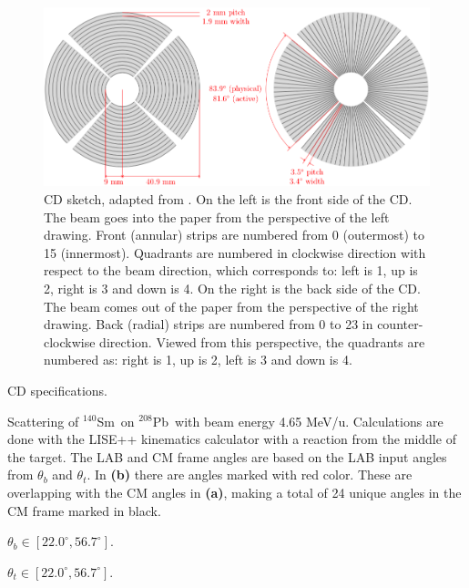 \documentclass[twoside,english]{uiofysmaster/uiofysmaster}
\newcommand{\Sm}{$^{140}$Sm} %
\newcommand{\Pb}{$^{208}$Pb}
\begin{document}
\begin{figure}[htb]
	\centering
	\includegraphics[width=\linewidth]{Images/CD.png}
	\caption{CD sketch, adapted from \cite{NWarr-CD}. 
	On the left is the front side of the CD. 
	The beam goes into the paper from the perspective of the left drawing.
	Front (annular) strips are numbered from 0 (outermost) to 15 (innermost). 
	Quadrants are numbered in clockwise direction with respect to the beam direction, which corresponds to: left is 1, up is 2, right is 3 and down is 4.
	On the right is the back side of the CD. 
	The beam comes out of the paper from the perspective of the right drawing.
	Back (radial) strips are numbered from 0 to 23 in counter-clockwise direction.
	Viewed from this perspective, the quadrants are numbered as: right is 1, up is 2, left is 3 and down is 4.}
	\label{fig:CD-FB}
\end{figure}

\begin{table}[htb] 
    \centering 
    \caption{CD specifications.}
	
	\label{tab:CD_spec}
\end{table}

\begin{table}[htb] 
    \centering 
    \caption{Scattering of \Sm\ on \Pb\ with beam energy 4.65 MeV/u.
    Calculations are done with the LISE++ \cite{LISE} kinematics calculator with a reaction from the middle of the target.
    The LAB and CM frame angles are based on the LAB input angles from $\theta_b$ and $\theta_t$. 
    In \textbf{(b)} there are angles marked with red color. 
    These are overlapping with the CM angles in \textbf{(a)}, making a total of 24 unique angles in the CM frame marked in black.}
	\label{tab:scattering}
    \begin{subtable}{0.45\textwidth}
    		\centering
		\caption{$\theta_b \in [22.0^\circ, 56.7^\circ]$.}
	 	\label{tab:LABvsCM_b}
	 	
	\end{subtable}
	\begin{subtable}{0.45\textwidth}
		\centering
		\caption{$\theta_t \in [22.0^\circ, 56.7^\circ]$.}
		\label{tab:LABvsCM_t}
		
	\end{subtable}
\end{table}
\end{document}
